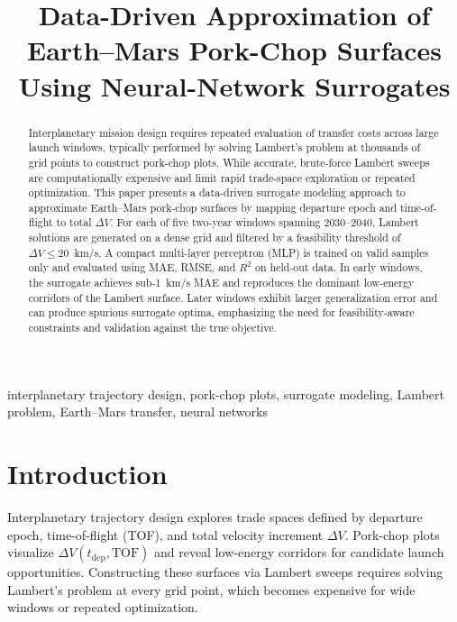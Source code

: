 \documentclass[conference]{IEEEtran}
\begin{document}
	
	\title{Data-Driven Approximation of Earth--Mars Pork-Chop Surfaces Using Neural-Network Surrogates}
	
	\author{
		}
	\maketitle
	
	\begin{abstract}
		Interplanetary mission design requires repeated evaluation of transfer costs across large launch windows, typically performed by solving Lambert’s problem at thousands of grid points to construct pork-chop plots. While accurate, brute-force Lambert sweeps are computationally expensive and limit rapid trade-space exploration or repeated optimization. This paper presents a data-driven surrogate modeling approach to approximate Earth--Mars pork-chop surfaces by mapping departure epoch and time-of-flight to total $\Delta V$. For each of five two-year windows spanning 2030--2040, Lambert solutions are generated on a dense grid and filtered by a feasibility threshold of $\Delta V \le 20$~km/s. A compact multi-layer perceptron (MLP) is trained on valid samples only and evaluated using MAE, RMSE, and $R^2$ on held-out data. In early windows, the surrogate achieves sub-1~km/s MAE and reproduces the dominant low-energy corridors of the Lambert surface. Later windows exhibit larger generalization error and can produce spurious surrogate optima, emphasizing the need for feasibility-aware constraints and validation against the true objective.
	\end{abstract}
	
	\begin{IEEEkeywords}
		interplanetary trajectory design, pork-chop plots, surrogate modeling, Lambert problem, Earth--Mars transfer, neural networks
	\end{IEEEkeywords}
	
	\section{Introduction}
	Interplanetary trajectory design explores trade spaces defined by departure epoch, time-of-flight (TOF), and total velocity increment $\Delta V$. Pork-chop plots visualize $\Delta V(t_{\mathrm{dep}},\mathrm{TOF})$ and reveal low-energy corridors for candidate launch opportunities. Constructing these surfaces via Lambert sweeps requires solving Lambert’s problem at every grid point, which becomes expensive for wide windows or repeated optimization.
	
\end{document}
